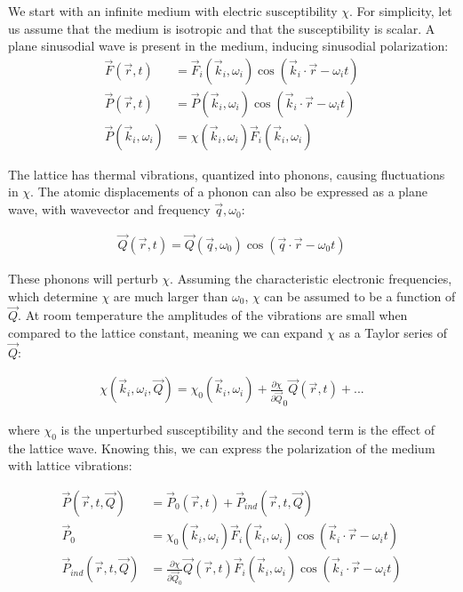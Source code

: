         We start with an infinite medium with electric susceptibility $\chi$. For simplicity, let us assume that the medium is isotropic
        and that the susceptibility is scalar. A plane sinusodial wave is present in the medium, inducing sinusodial polarization:
        \begin{align}
            \vec{F}(\vec{r}, t) &= \vec{F}_i(\vec{k}_i, \omega_i)\cos(\vec{k}_i\cdot\vec{r} - \omega_i t) \\
            \vec{P}(\vec{r}, t) &= \vec{P}(\vec{k}_i, \omega_i)\cos(\vec{k}_i\cdot\vec{r} - \omega_i t) \\
            \vec{P}(\vec{k}_i, \omega_i) &= \chi(\vec{k}_i, \omega_i)\vec{F}_i(\vec{k}_i, \omega_i)
        \end{align}

        The lattice has thermal vibrations, quantized into phonons, causing fluctuations in $\chi$. The atomic displacements of a phonon
        can also be expressed as a plane wave, with wavevector and frequency $\vec{q}, \omega_0$:

        \begin{align}
            \vec{Q}(\vec{r}, t) = \vec{Q}(\vec{q},\omega_0)\cos(\vec{q}\cdot\vec{r}-\omega_0 t)
        \end{align}

        These phonons will perturb $\chi$. Assuming the characteristic electronic frequencies, which determine $\chi$ are
        much larger than $\omega_0$, $\chi$ can be assumed to be a function of $\vec{Q}$. At room temperature the
        amplitudes of the vibrations are small when compared to the lattice constant, meaning we can expand $\chi$ as
        a Taylor series of $\vec{Q}$:

        \begin{align}
            \chi(\vec{k}_i, \omega_i, \vec{Q}) = \chi_0(\vec{k}_i, \omega_i) + \frac{\partial\chi}{\partial\vec{Q}}_0\vec{Q}(\vec{r},t) + ...
        \end{align}

        where $\chi_0$ is the unperturbed susceptibility and the second term is the effect of the lattice wave. Knowing this, we
        can express the polarization of the medium with lattice vibrations:

        \begin{align}
            \vec{P}(\vec{r}, t, \vec{Q}) &= \vec{P}_0(\vec{r},t) + \vec{P}_{ind}(\vec{r}, t, \vec{Q}) \\
            \vec{P}_0 &= \chi_0(\vec{k}_i, \omega_i)\vec{F}_i(\vec{k}_i, \omega_i)\cos(\vec{k}_i\cdot\vec{r} - \omega_i t) \\
            \vec{P}_{ind}(\vec{r}, t, \vec{Q}) &= \frac{\partial\chi}{\partial\vec{Q}_0}\vec{Q}(\vec{r},t)
                                                    \vec{F}_i(\vec{k}_i, \omega_i)\cos(\vec{k}_i\cdot\vec{r}-\omega_i t)
        \end{align}

